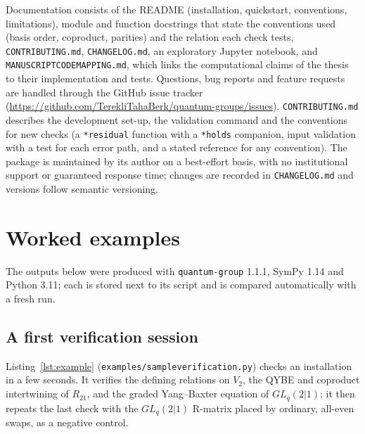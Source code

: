 \documentclass{SciPost}
\newcommand{\pkg}{\texttt{quantum-group}}
\newcommand{\code}[1]{\texttt{\begingroup\def\_{\textunderscore\allowbreak}#1\endgroup}}
\newcommand{\GL}{GL_q(2|1)}
\begin{document}
Documentation consists of the README (installation, quickstart, conventions, limitations), module and function docstrings that state the conventions used (basis order, coproduct, parities) and the relation each check tests, \code{CONTRIBUTING.md}, \code{CHANGELOG.md}, an exploratory Jupyter notebook, and \code{MANUSCRIPT\_CODE\_MAPPING.md}, which links the computational claims of the thesis to their implementation and tests. Questions, bug reports and feature requests are handled through the GitHub issue tracker (\url{https://github.com/TerekliTahaBerk/quantum-groups/issues}). \code{CONTRIBUTING.md} describes the development set-up, the validation command and the conventions for new checks (a \code{*\_residual} function with a \code{*\_holds} companion, input validation with a test for each error path, and a stated reference for any convention). The package is maintained by its author on a best-effort basis, with no institutional support or guaranteed response time; changes are recorded in \code{CHANGELOG.md} and versions follow semantic versioning.


\section{Worked examples}
\label{sec:examples}

The outputs below were produced with \pkg{} 1.1.1, SymPy 1.14 and Python 3.11; each is stored next to its script and is compared automatically with a fresh run.

\subsection{A first verification session}
\label{sec:ex-first}

Listing~\ref{lst:example} (\code{examples/sample\_verification.py}) checks an installation in a few seconds. It verifies the defining relations on $V_2$, the QYBE and coproduct intertwining of $R_{21}$, and the graded Yang--Baxter equation of $\GL$; it then repeats the last check with the $\GL$ R-matrix placed by ordinary, all-even swaps, as a negative control.
\end{document}

